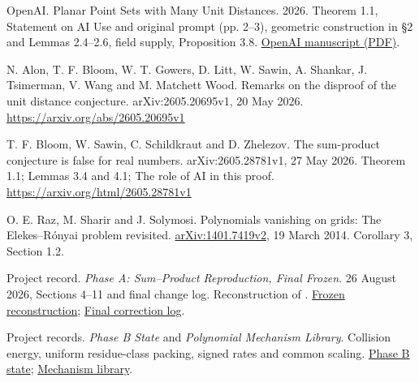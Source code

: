 
OpenAI. Planar Point Sets with Many Unit Distances. 2026. Theorem 1.1, Statement on AI Use and original prompt (pp. 2--3), geometric construction in \S{}2 and Lemmas 2.4--2.6, field supply, Proposition 3.8. \href{https://cdn.openai.com/pdf/74c24085-19b0-4534-9c90-465b8e29ad73/unit-distance-proof.pdf}{OpenAI manuscript (PDF)}.

N. Alon, T. F. Bloom, W. T. Gowers, D. Litt, W. Sawin, A. Shankar, J. Tsimerman, V. Wang and M. Matchett Wood. Remarks on the disproof of the unit distance conjecture. arXiv:2605.20695v1, 20 May 2026. \url{https://arxiv.org/abs/2605.20695v1}

T. F. Bloom, W. Sawin, C. Schildkraut and D. Zhelezov. The sum-product conjecture is false for real numbers. arXiv:2605.28781v1, 27 May 2026. Theorem 1.1; Lemmas 3.4 and 4.1; The role of AI in this proof. \url{https://arxiv.org/html/2605.28781v1}

O. E. Raz, M. Sharir and J. Solymosi. Polynomials vanishing on grids: The Elekes--Rónyai problem revisited. \href{https://arxiv.org/abs/1401.7419v2}{arXiv:1401.7419v2}, 19 March 2014. Corollary 3, Section 1.2.

Project record. \emph{Phase A: Sum--Product Reproduction, Final Frozen}. 26 August 2026, Sections 4--11 and final change log. Reconstruction of \cite{ref3}. \href{https://github.com/hnt119/polynomial-image-compression/blob/145d0e5a6ff725ab13cbb5c696bf335352e6f4a1/research/history-sources/Phase_A_Sum_Product_Reproduction_FINAL_FROZEN.pdf}{Frozen reconstruction}; \href{https://github.com/hnt119/polynomial-image-compression/blob/145d0e5a6ff725ab13cbb5c696bf335352e6f4a1/research/history-sources/Phase_A_FINAL_FROZEN_Change_Log.pdf}{Final correction log}.

Project records. \emph{Phase B State} and \emph{Polynomial Mechanism Library}. Collision energy, uniform residue-class packing, signed rates and common scaling. \href{https://github.com/hnt119/polynomial-image-compression/blob/145d0e5a6ff725ab13cbb5c696bf335352e6f4a1/research/history-sources/PHASE_B_STATE.md}{Phase B state}; \href{https://github.com/hnt119/polynomial-image-compression/blob/145d0e5a6ff725ab13cbb5c696bf335352e6f4a1/research/history-sources/POLYNOMIAL_MECHANISM_LIBRARY.md}{Mechanism library}.

